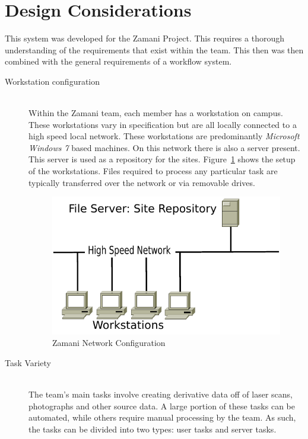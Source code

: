 \section{Design Considerations\label{design_consdierations}}
This system was developed for the Zamani Project. This requires
a thorough understanding of the requirements that exist within
the team. This then was then combined with the general requirements
of a workflow system.
\begin{description}
    \item[Workstation configuration] \hfill \\
        Within the Zamani team, each member has a workstation on campus.
        These workstations vary in specification but are all locally
        connected to a high speed local network. These workstations are
        predominantly \emph{Microsoft Windows 7} based machines.  On this
        network there is also a server present. This server is used as
        a repository for the sites. Figure~\ref{network_setup} shows the setup
        of the workstations. Files required to process any particular task are
        typically transferred over the network or via removable drives.
\begin{figure}[!h]
    \begin{center}
        \includegraphics[scale=0.6]{figures/networklayout.pdf}
    \end{center}
    \caption{Zamani Network Configuration}
    \label{network_setup}
\end{figure}
    \item[Task Variety] \hfill \\
        The team's main tasks involve creating derivative data off of laser
        scans, photographs and other source data. A large portion of these
        tasks can be automated, while others require manual processing by the
        team. As such, the tasks can be divided into two types: user tasks and
        server tasks.



\end{description}

